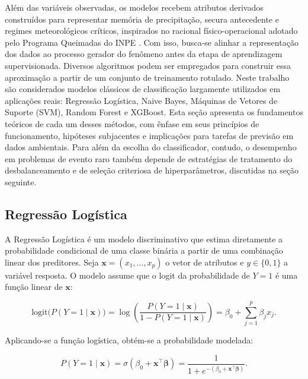 Além das variáveis observadas, os modelos recebem atributos derivados construídos para representar memória de precipitação, secura antecedente e regimes meteorológicos críticos, inspirados no racional físico-operacional adotado pelo Programa Queimadas do INPE \cite{setzer2019metodo}. Com isso, busca-se alinhar a representação dos dados ao processo gerador do fenômeno antes da etapa de aprendizagem supervisionada. Diversos algoritmos podem ser empregados para construir essa aproximação a partir de um conjunto de treinamento rotulado. Neste trabalho são considerados modelos clássicos de classificação largamente utilizados em aplicações reais: Regressão Logística, Naive Bayes, Máquinas de Vetores de Suporte (SVM), Random Forest e XGBoost. Esta seção apresenta os fundamentos teóricos de cada um desses métodos, com ênfase em seus princípios de funcionamento, hipóteses subjacentes e implicações para tarefas de previsão em dados ambientais. Para além da escolha do classificador, contudo, o desempenho em problemas de evento raro também depende de estratégias de tratamento do desbalanceamento e de seleção criteriosa de hiperparâmetros, discutidas na seção seguinte.

\subsection{Regressão Logística}

A Regressão Logística é um modelo discriminativo que estima diretamente a probabilidade condicional de uma classe binária a partir de uma combinação linear dos preditores. Seja $\mathbf{x} = (x_1,\ldots,x_p)$ o vetor de atributos e $y \in \{0,1\}$ a variável resposta. O modelo assume que o logit da probabilidade de $Y=1$ é uma função linear de $\mathbf{x}$:

\begin{equation}
\label{eq:logistic_model}
\text{logit}\bigl(P(Y=1 \mid \mathbf{x})\bigr)
= \log \left( \frac{P(Y=1 \mid \mathbf{x})}{1 - P(Y=1 \mid \mathbf{x})} \right)
= \beta_0 + \sum_{j=1}^p \beta_j x_j.
\end{equation}

Aplicando-se a função logística, obtém-se a probabilidade modelada:

\begin{equation}
P(Y=1 \mid \mathbf{x}) = \sigma(\beta_0 + \mathbf{x}^\top \boldsymbol{\beta})
= \frac{1}{1 + e^{-(\beta_0 + \mathbf{x}^\top \boldsymbol{\beta})}}.
\end{equation}

